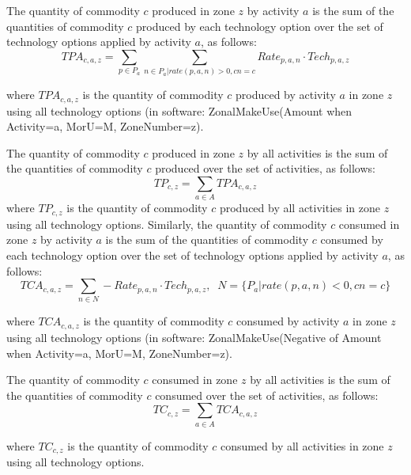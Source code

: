 The quantity of commodity $c$ produced in zone $z$ by activity $a$ is the sum of the quantities of commodity $c$ produced by each technology option over the set of technology options applied by activity $a$, as follows:
\begin{equation}\label{eq:6.08}
TPA_{c,a,z} = \sum_{p \in P_a} \sum_{n \in P_a | rate(p,a,n)>0, cn=c} Rate_{p,a,n} \cdot Tech_{p,a,z}
\end{equation}

\noindent where ${TPA}_{c,a,z}$ is the quantity of commodity $c$ produced by activity $a$ in zone $z$ using all technology options (in software: ZonalMakeUse(Amount when Activity=a, MorU=M, ZoneNumber=z).

The quantity of commodity $c$ produced in zone $z$ by all activities is the sum of the quantities of commodity $c$ produced over the set of activities, as follows:
\begin{equation}\label{eq:6.09}
TP_{c,z} = \sum_{a \in A} TPA_{c,a,z}
\end{equation}
\noindent where $TP_{c,z}$ is the quantity of commodity $c$ produced by all activities in zone $z$ using all technology options. Similarly, the quantity of commodity $c$ consumed in zone $z$ by activity $a$ is the sum of the quantities of commodity $c$ consumed by each technology option over the set of technology options applied by activity $a$, as follows:
\begin{equation}\label{eq:6.10}
TCA_{c,a,z} = \sum_{n \in N} -Rate_{p,a,n} \cdot Tech_{p,a,z}, \;\; N = \{P_a | rate(p,a,n)<0, cn=c\}
\end{equation}

\noindent where $TCA_{c,a,z}$ is the quantity of commodity $c$ consumed by activity $a$ in zone $z$ using all technology options (in software: ZonalMakeUse(Negative of Amount when Activity=a, MorU=M, ZoneNumber=z).

The quantity of commodity $c$ consumed in zone $z$ by all activities is the sum of the quantities of commodity $c$ consumed over the set of activities, as follows:
\begin{equation}\label{eq:6.11}
TC_{c,z} = \sum_{a \in A} TCA_{c,a,z}
\end{equation}

\noindent where $TC_{c,z}$ is the quantity of commodity $c$ consumed by all activities in zone $z$ using all technology options.

